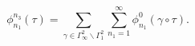 \begin{equation}
\phi^{n_{3}}_{n_{1}} (\tau) =
\sum\limits_{\gamma\in\Gamma^{2}_{\infty}\backslash\Gamma^{2}_{1}}
\sum\limits_{n_{1}=1}^{\infty}\phi^0_{n_{1}}(\gamma\circ\tau).
\end{equation}


